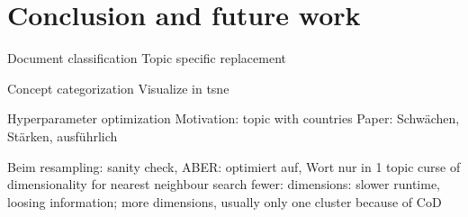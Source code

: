 \documentclass[
        a4paper,
        titlepage,
        twoside,
        parskip,
        numbers=noenddot
        ]{scrbook}
\theoremstyle{break}
\begin{document}
\chapter{Conclusion and future work}
\label{sec:conclusion}

Document classification
Topic specific replacement

Concept categorization
Visualize in tsne

Hyperparameter optimization
Motivation: topic with countries
Paper: Schwächen, Stärken, ausführlich

Beim resampling: sanity check, ABER: optimiert auf, Wort nur in 1 topic
curse of dimensionality for nearest neighbour search
fewer: dimensions: slower runtime, loosing information; more dimensions, usually only one cluster because of CoD

\clearpage
\printbibliography
\end{document}

